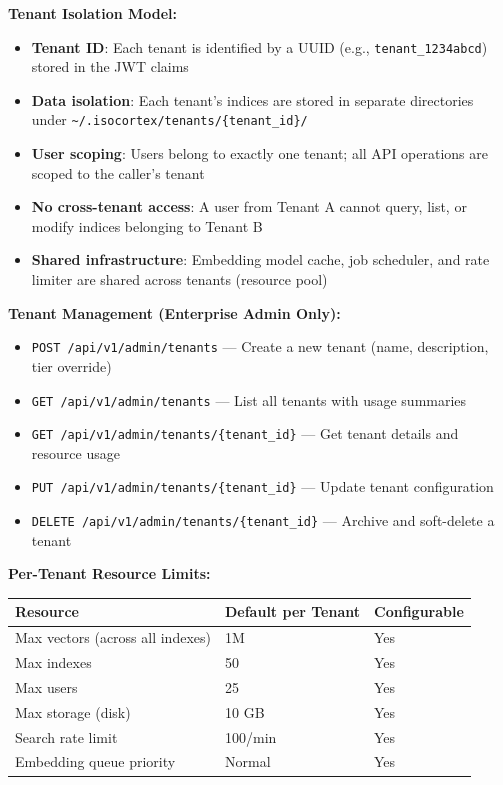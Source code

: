 \documentclass[11pt,a4paper]{article}
\newcommand{\inlinecode}[1]{\texttt{\small\colorbox{ctCodeBg}{#1}}}
\begin{document}
\begin{reqbox}
\textbf{Tenant Isolation Model:}
\begin{itemize}
    \item \textbf{Tenant ID}: Each tenant is identified by a UUID (e.g., \inlinecode{tenant\_1234abcd}) stored in the JWT claims
    \item \textbf{Data isolation}: Each tenant's indices are stored in separate directories under \inlinecode{\textasciitilde/.isocortex/tenants/\{tenant\_id\}/}
    \item \textbf{User scoping}: Users belong to exactly one tenant; all API operations are scoped to the caller's tenant
    \item \textbf{No cross-tenant access}: A user from Tenant A cannot query, list, or modify indices belonging to Tenant B
    \item \textbf{Shared infrastructure}: Embedding model cache, job scheduler, and rate limiter are shared across tenants (resource pool)
\end{itemize}

\textbf{Tenant Management (Enterprise Admin Only):}
\begin{itemize}
    \item \inlinecode{POST /api/v1/admin/tenants} --- Create a new tenant (name, description, tier override)
    \item \inlinecode{GET /api/v1/admin/tenants} --- List all tenants with usage summaries
    \item \inlinecode{GET /api/v1/admin/tenants/\{tenant\_id\}} --- Get tenant details and resource usage
    \item \inlinecode{PUT /api/v1/admin/tenants/\{tenant\_id\}} --- Update tenant configuration
    \item \inlinecode{DELETE /api/v1/admin/tenants/\{tenant\_id\}} --- Archive and soft-delete a tenant
\end{itemize}

\textbf{Per-Tenant Resource Limits:}
\begin{center}
\begin{tabular}{@{}lll@{}}
\toprule
\textbf{Resource} & \textbf{Default per Tenant} & \textbf{Configurable} \\
\midrule
Max vectors (across all indexes) & 1M & Yes \\
Max indexes & 50 & Yes \\
Max users & 25 & Yes \\
Max storage (disk) & 10 GB & Yes \\
Search rate limit & 100/min & Yes \\
Embedding queue priority & Normal & Yes \\
\bottomrule
\end{tabular}
\end{center}
\end{reqbox}
\end{document}

